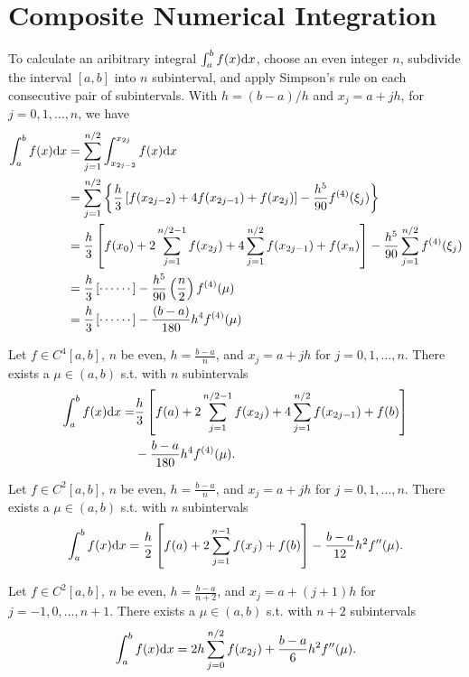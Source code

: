 \section{Composite Numerical Integration}
To calculate an aribitrary integral $\int_a^bf(x)\mathrm{d} x$, choose an even integer $n$, subdivide the interval $[a,b]$ into $n$ subinterval, and apply Simpson's rule on each consecutive pair of subintervals. With $h=(b-a)/h$ and $x_j=a+jh$, for $j=0,1,\ldots,n$, we have
\begin{align*}
    \int_a^bf(x)\mathrm{d} x &= \sum_{j=1}^{n/2}\int_{x_{2j-2}}^{x_{2j}}f(x)\mathrm{d} x \\
    &= \sum_{j=1}^{n/2}\left\{\frac{h}{3}\left[f(x_{2j-2})+4f(x_{2j-1})+f(x_{2j})\right]-\frac{h^5}{90}f^{(4)}(\xi_j)\right\} \\
    &= \frac{h}{3}\left[f(x_0)+2\sum_{j=1}^{n/2-1}f(x_{2j})+4\sum_{j=1}^{n/2}f(x_{2j-1})+f(x_n)\right] - \frac{h^5}{90}\sum_{j=1}^{n/2}f^{(4)}(\xi_j) \\
    &= \frac{h}{3}\left[\cdots\cdots\right]-\frac{h^5}{90}\left(\frac{n}{2}\right)f^{(4)}(\mu) \\
    &= \frac{h}{3}\left[\cdots\cdots\right]-\frac{(b-a)}{180}h^4f^{(4)}(\mu) \\
\end{align*}

\begin{theo}
Let $f\in C^4[a,b]$, $n$ be even, $h=\frac{b-a}{n}$, and $x_j=a+jh$ for $j=0,1,\ldots,n$.
There exists a $\mu\in(a,b)$ s.t. with $n$ subintervals
\begin{align*}
\int_a^bf(x)\mathrm{d} x =& \frac{h}{3}\left[f(a)+2\sum_{j=1}^{n/2-1}f(x_{2j})+4\sum_{j=1}^{n/2}f(x_{2j-1})+f(b)\right] \\
&- \frac{b-a}{180}h^4f^{(4)}(\mu).
\end{align*}
\end{theo}

\begin{theo}
Let $f\in C^2[a,b]$, $n$ be even, $h=\frac{b-a}{n}$, and $x_j=a+jh$ for $j=0,1,\ldots,n$.
There exists a $\mu\in(a,b)$ s.t. with $n$ subintervals
\[
\int_a^bf(x)\mathrm{d} x=\frac{h}{2}\left[f(a)+2\sum_{j=1}^{n-1}f(x_j)+f(b)\right] - \frac{b-a}{12}h^2f''(\mu).
\]
\end{theo}

\begin{theo}
Let $f\in C^2[a,b]$, $n$ be even, $h=\frac{b-a}{n+2}$, and $x_j=a+(j+1)h$ for $j=-1,0,\ldots,n+1$.
There exists a $\mu\in(a,b)$ s.t. with $n+2$ subintervals
\[
\int_a^bf(x)\mathrm{d} x=2h\sum_{j=0}^{n/2}f(x_{2j}) + \frac{b-a}{6}h^2f''(\mu).
\]
\end{theo}

